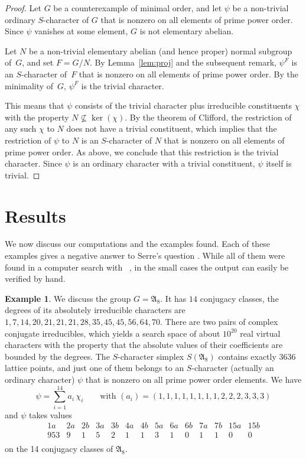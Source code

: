 \documentclass[12pt,leqno,a4paper]{amsart}
\newcommand{\fA}{{\mathfrak{A}}} %
\newcommand{\OSCAR}{{\sf{OSCAR}}\xspace}
\theoremstyle{definition}
\newtheorem{exmp}[thm]{Example}
\begin{document}
\begin{proof}
Let $G$ be a counterexample of minimal order, and let $\psi$ be a non-trivial
ordinary $S$-character of $G$ that is nonzero on all elements of prime power
order. Since $\psi$ vanishes at some element, $G$ is not elementary abelian.

Let $N$ be a non-trivial elementary abelian (and hence proper) normal subgroup
of~$G$, and set $F = G/N$. By Lemma~\ref{lem:proj} and the subsequent remark,
$\psi^F$ is an $S$-character of~$F$ that is nonzero on all elements of prime
power order. By the minimality of~$G$, $\psi^F$ is the trivial character.

This means that $\psi$ consists of the trivial character plus irreducible
constituents $\chi$ with the property $N \not\subseteq \ker(\chi)$.
By the theorem of Clifford, the restriction of any such $\chi$ to $N$ does not
have a trivial constituent, which implies that the restriction of $\psi$ to $N$
is an $S$-character of $N$ that is nonzero on all elements of prime power order.
As above, we conclude that this restriction is the trivial character.
Since $\psi$ is an ordinary character with a trivial constituent,
$\psi$ itself is trivial.
\end{proof}


\section{Results}   \label{sec:ex}

We now discuss our computations and the examples found.
Each of these examples gives a negative answer to Serre's question \cite{Se}.
While all of them were found in a computer search with
\OSCAR~\cite{OSCAR-book,OSCAR}, in the small cases the output can easily be
verified by hand.

\begin{exmp}   \label{xplJ1A8}
We discuss the group $G = \fA_8$. It has $14$ conjugacy classes, the degrees of
its absolutely irreducible characters are
$1, 7, 14, 20, 21, 21, 21, 28, 35, 45, 45, 56, 64, 70$.
There are two pairs of complex conjugate irreducibles, which yields a search
space of about $10^{20}$ real virtual characters with the property that the
absolute values of their coefficients are bounded by the degrees.
The $S$-character simplex $S(\fA_8)$ contains exactly $3636$ lattice points,
and just one of them belongs to an $S$-character (actually an ordinary
character) $\psi$ that is nonzero on all prime power order elements. We have
$$\psi =\sum_{i=1}^{14}a_i\,\chi_i\qquad
  \text{with $(a_i)=(1, 1, 1, 1, 1, 1, 1, 1, 2, 2, 2, 3, 3, 3)$}$$
and $\psi$ takes values
$$\begin{array}{cccccccccccccccccccc}
   1a& 2a& 2b& 3a& 3b& 4a& 4b& 5a& 6a& 6b& 7a& 7b& 15a& 15b\\
\hline
  953& 9& 1& 5& 2& 1& 1& 3& 1& 0& 1& 1& 0& 0\\
\end{array}$$
on the 14 conjugacy classes of $\fA_8$.
\end{exmp}
\end{document}
